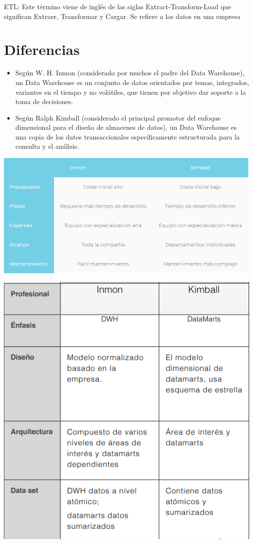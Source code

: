 \documentclass[preprint,12pt]{elsarticle}
\begin{document}
ETL: Este término viene de inglés de las siglas Extract-Transform-Load que significan Extraer, Transformar y Cargar. Se refiere a los datos en una empresa
\section{Diferencias}
\begin{itemize}
\item Según W. H. Inmon (considerado por muchos el padre del Data Warehouse), un Data Warehouse es un conjunto de datos orientados por temas, integrados, variantes en el tiempo y no volátiles, que tienen por objetivo dar soporte a la toma de decisiones.
\item Según Ralph Kimball (considerado el principal promotor del enfoque dimensional para el diseño de almacenes de datos), un Data Warehouse es una copia de los datos transaccionales específicamente estructurada para la consulta y el análisis.
\end{itemize}
\begin {center}
\includegraphics[scale= 0.80]{./Imagenes/vs.png}
\end {center}
\begin {center}
\includegraphics[scale= 0.80]{./Imagenes/vs2.png}
\end {center}
\end{document}
